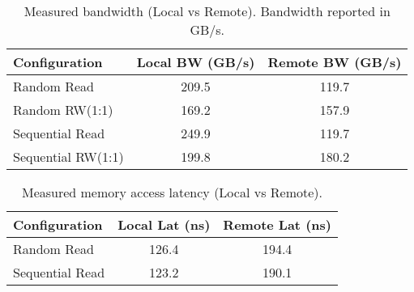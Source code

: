 \begin{table}[t]
\begin{center}
\caption{Measured bandwidth (Local vs Remote). Bandwidth reported in GB/s.}
\label{table:bandwidth}
\small
\begin{tabular}{| l | c | c |}
\hline
Configuration & Local BW (GB/s) & Remote BW (GB/s) \\
\hline\hline
Random Read & 209.5 & 119.7 \\ \hline
Random RW(1:1) & 169.2 & 157.9 \\ \hline
Sequential Read & 249.9 & 119.7 \\ \hline
Sequential RW(1:1) & 199.8 & 180.2 \\ \hline
\end{tabular}
\end{center}
\end{table}

\begin{table}[t]
\begin{center}
\caption{Measured memory access latency (Local vs Remote).}
\label{table:latency}
\small
\begin{tabular}{| l | c | c |}
\hline
Configuration & Local Lat (ns) & Remote Lat (ns) \\
\hline\hline
Random Read & 126.4 & 194.4 \\ \hline
Sequential Read & 123.2 & 190.1 \\ \hline
\end{tabular}
\end{center}
\end{table}